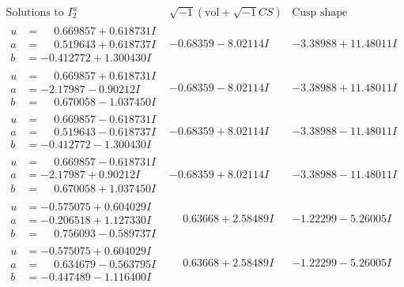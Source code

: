 \documentclass[1p]{elsarticle_modified}
\theoremstyle{definition}
\newcommand{\I}{\sqrt{-1}}
\begin{document}
$$\begin{array}{c|c|c}  
\text{Solutions to }I^u_{2}& \I (\text{vol} + \sqrt{-1}CS) & \text{Cusp shape}\\
 \hline 
\begin{aligned}
u &= \phantom{-}0.669857 + 0.618731 I \\
a &= \phantom{-}0.519643 + 0.618737 I \\
b &= -0.412772 + 1.300430 I\end{aligned}
 & -0.68359 - 8.02114 I & -3.38988 + 11.48011 I \\ \hline\begin{aligned}
u &= \phantom{-}0.669857 + 0.618731 I \\
a &= -2.17987 - 0.90212 I \\
b &= \phantom{-}0.670058 - 1.037450 I\end{aligned}
 & -0.68359 - 8.02114 I & -3.38988 + 11.48011 I \\ \hline\begin{aligned}
u &= \phantom{-}0.669857 - 0.618731 I \\
a &= \phantom{-}0.519643 - 0.618737 I \\
b &= -0.412772 - 1.300430 I\end{aligned}
 & -0.68359 + 8.02114 I & -3.38988 - 11.48011 I \\ \hline\begin{aligned}
u &= \phantom{-}0.669857 - 0.618731 I \\
a &= -2.17987 + 0.90212 I \\
b &= \phantom{-}0.670058 + 1.037450 I\end{aligned}
 & -0.68359 + 8.02114 I & -3.38988 - 11.48011 I \\ \hline\begin{aligned}
u &= -0.575075 + 0.604029 I \\
a &= -0.206518 + 1.127330 I \\
b &= \phantom{-}0.756093 - 0.589737 I\end{aligned}
 & \phantom{-}0.63668 + 2.58489 I & -1.22299 - 5.26005 I \\ \hline\begin{aligned}
u &= -0.575075 + 0.604029 I \\
a &= \phantom{-}0.634679 - 0.563795 I \\
b &= -0.447489 - 1.116400 I\end{aligned}
 & \phantom{-}0.63668 + 2.58489 I & -1.22299 - 5.26005 I \\ \hline\begin{aligned}

\end{aligned}
\end{array}$$
\end{document}
